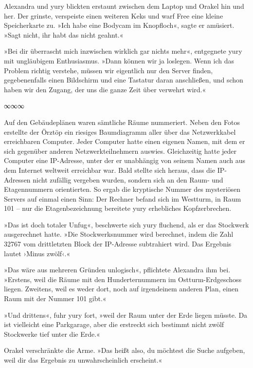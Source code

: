 Alexandra und yury blickten erstaunt zwischen dem Laptop und Orakel hin und her. Der grinste, verspeiste einen weiteren Keks und warf Free eine kleine Speicherkarte zu. »Ich habe eine Bodycam im Knopfloch«, sagte er amüsiert. »Sagt nicht, ihr habt das nicht geahnt.«

»Bei dir überrascht mich inzwischen wirklich gar nichts mehr«, entgegnete yury mit ungläubigem Enthusiasmus. »Dann können wir ja loslegen. Wenn ich das Problem richtig verstehe, müssen wir eigentlich nur den Server finden, gegebenenfalls einen Bildschirm und eine Tastatur daran anschließen, und schon haben wir den Zugang, der uns die ganze Zeit über verwehrt wird.«

\begin{center}
	∞∞∞
\end{center}

Auf den Gebäudeplänen waren sämtliche Räume nummeriert. Neben den Fotos erstellte der Örztöp ein riesiges Baumdiagramm aller über das Netzwerkkabel erreichbaren Computer. Jeder Computer hatte einen eigenen Namen, mit dem er sich gegenüber anderen Netzwerkteilnehmern auswies. Gleichzeitig hatte jeder Computer eine IP-Adresse, unter der er unabhängig von seinem Namen auch aus dem Internet weltweit erreichbar war. Bald stellte sich heraus, dass die IP-Adressen nicht zufällig vergeben wurden, sondern sich an den Raum- und Etagennummern orientierten. So ergab die kryptische Nummer des mysteriösen Servers auf einmal einen Sinn: Der Rechner befand sich im Westturm, in Raum 101 – nur die Etagenbezeichnung bereitete yury erhebliches Kopfzerbrechen.

»Das ist doch totaler Unfug«, beschwerte sich yury fluchend, als er das Stockwerk ausgerechnet hatte. »Die Stockwerksnummer wird berechnet, indem die Zahl 32767 vom drittletzten Block der IP-Adresse subtrahiert wird. Das Ergebnis lautet ›Minus zwölf‹.«

»Das wäre aus mehreren Gründen unlogisch«, pflichtete Alexandra ihm bei. »Erstens, weil die Räume mit den Hunderternummern im Ostturm-Erdgeschoss liegen. Zweitens, weil es weder dort, noch auf irgendeinem anderen Plan, einen Raum mit der Nummer 101 gibt.«

»Und drittens«, fuhr yury fort, »weil der Raum unter der Erde liegen müsste. Da ist vielleicht eine Parkgarage, aber die erstreckt sich bestimmt nicht zwölf Stockwerke tief unter die Erde.«

Orakel verschränkte die Arme. »Das heißt also, du möchtest die Suche aufgeben, weil dir das Ergebnis zu unwahrscheinlich erscheint.«

